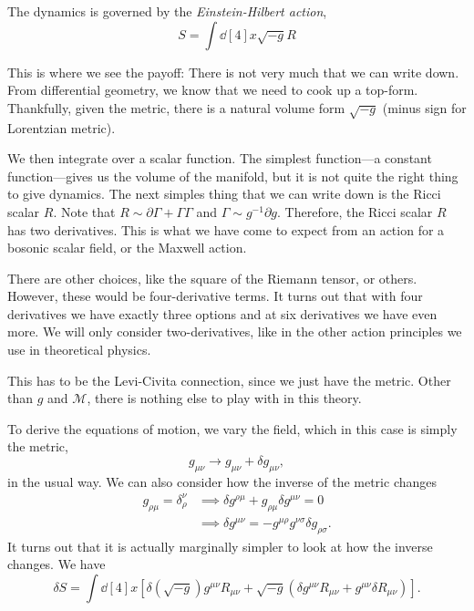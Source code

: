 The dynamics is governed by the \emph{Einstein-Hilbert action},
\begin{equation}
  S = \int \dd[4]{x} \sqrt{-g} R
\end{equation}
\begin{leftbar}
  \begin{remark}
    This is where we see the payoff: There is not very much that we can write down.
    From differential geometry, we know that we need to cook up a top-form. Thankfully, given the metric, there is a natural volume form $\sqrt{-g}$ (minus sign for Lorentzian metric).

    We then integrate over a scalar function. The simplest function---a constant function---gives us the volume of the manifold, but it is not quite the right thing to give dynamics.
    The next simples thing that we can write down is the Ricci scalar $R$.
    Note that $R \sim \partial\Gamma + \Gamma \Gamma$ and $\Gamma \sim g^{-1} \partial g$. Therefore, the Ricci scalar $R$ has two derivatives.
    This is what we have come to expect from an action for a bosonic scalar field, or the Maxwell action.

    There are other choices, like the square of the Riemann tensor, or others. However, these would be four-derivative terms. 
    It turns out that with four derivatives we have exactly three options and at six derivatives we have even more.
    We will only consider two-derivatives, like in the other action principles we use in theoretical physics.
  \end{remark}
\end{leftbar}
\begin{leftbar}
  \begin{remark}
    This has to be the Levi-Civita connection, since we just have the metric. Other than $g$ and $\mathcal{M}$, there is nothing else to play with in this theory.
  \end{remark}
\end{leftbar}
To derive the equations of motion, we vary the field, which in this case is simply the metric,
\begin{equation}
  g_{\mu\nu} \to g_{\mu\nu} + \delta g_{\mu\nu},
\end{equation}
in the usual way.
We can also consider how the inverse of the metric changes
\begin{align}
  g_{\rho\mu} = \delta^{\nu}_{\rho} &\implies \delta g^{\rho\mu} + g_{\rho\mu} \delta g^{\mu\nu} = 0 \\
	      &\implies \delta g^{\mu\nu} = - g^{\mu\rho} g^{\nu\sigma} \delta g_{\rho\sigma}.
\end{align}
It turns out that it is actually marginally simpler to look at how the inverse changes.
We have
\begin{equation}
  \delta S = \int \dd[4]{x} \left[  \delta (\sqrt{-g}) g^{\mu\nu} R_{\mu\nu} + \sqrt{-g} \left( \delta g^{\mu\nu} R_{\mu\nu} + g^{\mu\nu} \delta R_{\mu\nu}\right) \right].
\end{equation}

